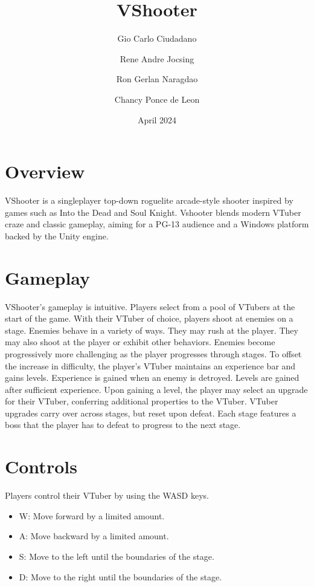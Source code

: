 \documentclass[10pt, a4paper]{article}
\title{\textbf{VShooter}}
\author{Gio Carlo Ciudadano \and Rene Andre Jocsing \and Ron Gerlan Naragdao \and Chancy Ponce de Leon}
\date{April 2024}
\begin{document}
\maketitle

	\begin{multicols}{2}

	\section{Overview}

	VShooter is a singleplayer top-down roguelite arcade-style shooter inspired by games such as Into the Dead and Soul Knight. Vshooter blends modern VTuber craze and classic gameplay, aiming for a PG-13 audience and a Windows platform backed by the Unity engine.

  	\section{Gameplay}

	VShooter's gameplay is intuitive. Players select from a pool of VTubers at the start of the game. With their VTuber of choice, players shoot at enemies on a stage. Enemies behave in a variety of ways. They may rush at the player. They may also shoot at the player or exhibit other behaviors. Enemies become progressively more challenging as the player progresses through stages. To offset the increase in difficulty, the player's VTuber maintains an experience bar and gains levels. Experience is gained when an enemy is detroyed. Levels are gained after sufficient experience. Upon gaining a level, the player may select an upgrade for their VTuber, conferring additional properties to the VTuber. VTuber upgrades carry over across stages, but reset upon defeat. Each stage features a boss that the player has to defeat to progress to the next stage.

	\section{Controls}

	Players control their VTuber by using the WASD keys.

	\begin{itemize}
		\item W: Move forward by a limited amount.
		\item A: Move backward by a limited amount.
		\item S: Move to the left until the boundaries of the stage.
		\item D: Move to the right until the boundaries of the stage.
	\end{itemize}


\end{multicols}
\end{document}

